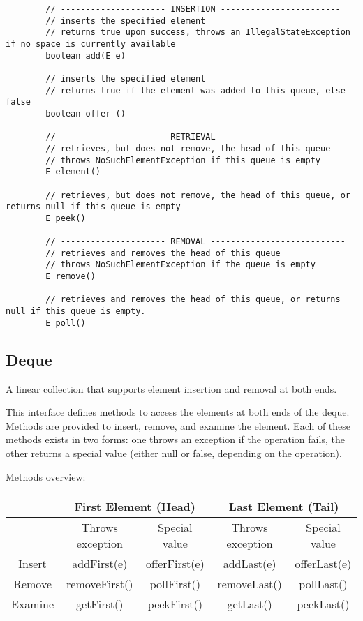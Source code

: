 \documentclass{scrartcl}
\begin{document}
    \bigskip

    \begin{lstlisting}
        // --------------------- INSERTION ------------------------
        // inserts the specified element
        // returns true upon success, throws an IllegalStateException if no space is currently available
        boolean add(E e)

        // inserts the specified element
        // returns true if the element was added to this queue, else false
        boolean offer ()

        // --------------------- RETRIEVAL -------------------------
        // retrieves, but does not remove, the head of this queue
        // throws NoSuchElementException if this queue is empty
        E element()

        // retrieves, but does not remove, the head of this queue, or returns null if this queue is empty
        E peek()

        // --------------------- REMOVAL ---------------------------
        // retrieves and removes the head of this queue
        // throws NoSuchElementException if the queue is empty
        E remove()

        // retrieves and removes the head of this queue, or returns null if this queue is empty.
        E poll()
    \end{lstlisting}

\subsection{Deque}

    A linear collection that supports element insertion and removal at both ends.

    This interface defines methods to access the elements at both ends of the deque. Methods are provided to insert, remove, and examine the element. Each of these methods exists in two forms: one throws an exception if the operation fails, the other returns a special value (either null or false, depending on the operation).

    \bigskip

    Methods overview:

    \bigskip

    \begin{tabular}{|c|c|c|c|c|}
        \hline
        &  \multicolumn{2}{c}{First Element (Head)} & \multicolumn{2}{c}{Last Element (Tail)} \\
        \hline
        & Throws exception & Special value  & Throws exception & Special value  \\
        \hline
        Insert & addFirst(e) & offerFirst(e) & addLast(e) & offerLast(e) \\
        \hline
        Remove& removeFirst() & pollFirst() & removeLast() & pollLast() \\
        \hline
        Examine& getFirst() & peekFirst() & getLast() &  peekLast()\\
        \hline
    \end{tabular}
\end{document}
